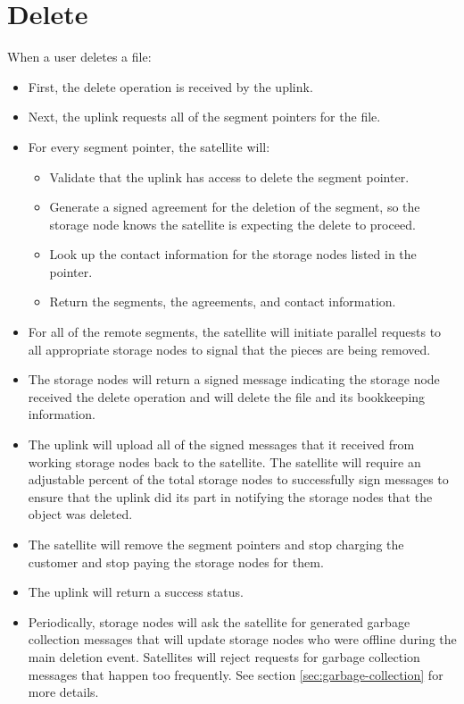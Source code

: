 \documentclass[11pt,fleqn,openany]{book}
\begin{document}
\section{Delete}

When a user deletes a file:

\begin{itemize}
\item First, the delete operation is received by the uplink.
\item Next, the uplink requests all of the segment pointers for the file.
\item For every segment pointer, the satellite will:
  \begin{itemize}
  \item Validate that the uplink has access to delete the segment pointer.
  \item Generate a signed agreement for the deletion of the segment, so the
    storage node knows the satellite is expecting the delete to proceed.
  \item Look up the contact information for the storage nodes listed in the
  pointer.
  \item Return the segments, the agreements, and contact information.
  \end{itemize}
\item For all of the remote segments, the satellite will
  initiate parallel requests to all appropriate storage nodes to signal that the
  pieces are being removed.
\item The storage nodes will return a signed message indicating the storage node
received the
delete operation and will delete the file and its bookkeeping information.
\item The uplink will upload all of the signed messages that it received from
  working storage nodes back to the satellite. The satellite will require an
  adjustable percent of the total storage nodes to successfully sign messages
  to ensure that the uplink did its part in notifying the storage nodes that the
  object was deleted.
\item The satellite will remove the segment pointers and stop charging the
  customer and stop paying the storage nodes for them.
\item The uplink will return a success status.
\item Periodically, storage nodes will ask the satellite for generated garbage
  collection messages that will update storage nodes who were offline during the
  main deletion event.
  Satellites will reject requests for garbage collection messages that
  happen too frequently. See section \ref{sec:garbage-collection} for more
  details.
\end{itemize}
\end{document}
